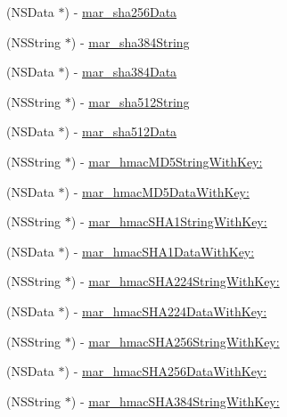 \begin{DoxyCompactItemize}
\item 
(N\+S\+Data $\ast$) -\/ \hyperlink{category_n_s_data_07_m_a_r_e_x_08_a7ba543924c00f7d98c15d2ea3ed4c7b1}{mar\+\_\+sha256\+Data}
\item 
(N\+S\+String $\ast$) -\/ \hyperlink{category_n_s_data_07_m_a_r_e_x_08_a07f6e1f12010f6456d9434fcff064f94}{mar\+\_\+sha384\+String}
\item 
(N\+S\+Data $\ast$) -\/ \hyperlink{category_n_s_data_07_m_a_r_e_x_08_a64bbc1b66a50f5784b692001016fc7f5}{mar\+\_\+sha384\+Data}
\item 
(N\+S\+String $\ast$) -\/ \hyperlink{category_n_s_data_07_m_a_r_e_x_08_ac3d984d84d0217d84947f78f2c4296dc}{mar\+\_\+sha512\+String}
\item 
(N\+S\+Data $\ast$) -\/ \hyperlink{category_n_s_data_07_m_a_r_e_x_08_af26a58f2799c1d1c653e391dc0e56d5e}{mar\+\_\+sha512\+Data}
\item 
(N\+S\+String $\ast$) -\/ \hyperlink{category_n_s_data_07_m_a_r_e_x_08_a0c49192cd142b1db6199b9164ed559df}{mar\+\_\+hmac\+M\+D5\+String\+With\+Key\+:}
\item 
(N\+S\+Data $\ast$) -\/ \hyperlink{category_n_s_data_07_m_a_r_e_x_08_a58af8e394ee3296d3b638f2bef7ab5d7}{mar\+\_\+hmac\+M\+D5\+Data\+With\+Key\+:}
\item 
(N\+S\+String $\ast$) -\/ \hyperlink{category_n_s_data_07_m_a_r_e_x_08_af09d166373bf8f361f340626ab70777d}{mar\+\_\+hmac\+S\+H\+A1\+String\+With\+Key\+:}
\item 
(N\+S\+Data $\ast$) -\/ \hyperlink{category_n_s_data_07_m_a_r_e_x_08_ab391c584364cc64655547a40322de64d}{mar\+\_\+hmac\+S\+H\+A1\+Data\+With\+Key\+:}
\item 
(N\+S\+String $\ast$) -\/ \hyperlink{category_n_s_data_07_m_a_r_e_x_08_ab24c3cc0680ab46e4e102fde09e5741f}{mar\+\_\+hmac\+S\+H\+A224\+String\+With\+Key\+:}
\item 
(N\+S\+Data $\ast$) -\/ \hyperlink{category_n_s_data_07_m_a_r_e_x_08_aa868eeb4dc331761fc7d64af1486c793}{mar\+\_\+hmac\+S\+H\+A224\+Data\+With\+Key\+:}
\item 
(N\+S\+String $\ast$) -\/ \hyperlink{category_n_s_data_07_m_a_r_e_x_08_a9bf4c0687c230f5a3151cf9b919b3659}{mar\+\_\+hmac\+S\+H\+A256\+String\+With\+Key\+:}
\item 
(N\+S\+Data $\ast$) -\/ \hyperlink{category_n_s_data_07_m_a_r_e_x_08_a512511db285cd847255112b73726672a}{mar\+\_\+hmac\+S\+H\+A256\+Data\+With\+Key\+:}
\item 
(N\+S\+String $\ast$) -\/ \hyperlink{category_n_s_data_07_m_a_r_e_x_08_a780c94fba74c2f5c87a7aecb79ccd60a}{mar\+\_\+hmac\+S\+H\+A384\+String\+With\+Key\+:}

\end{DoxyCompactItemize}
